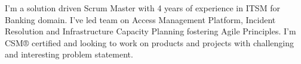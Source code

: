 

\begin{cvparagraph}

I'm a solution driven Scrum Master with 4 years of experience in ITSM for Banking domain. I've led team on Access Management Platform, Incident Resolution and Infrastructure Capacity Planning fostering Agile Principles. I'm CSM® certified and looking to work on products and projects with challenging and interesting problem statement.
\end{cvparagraph}
